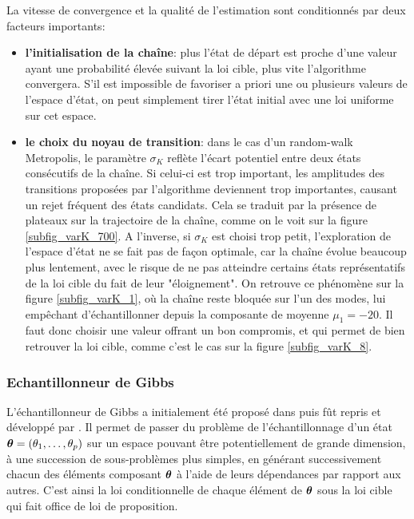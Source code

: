 La vitesse de convergence et la qualité de l'estimation sont conditionnés par deux facteurs importants: 
\begin{itemize}
	\item \textbf{l'initialisation de la chaîne}: plus l'état de départ est proche d'une valeur ayant une probabilité élevée suivant la loi cible, plus vite l'algorithme convergera. S'il est impossible de favoriser a priori une ou plusieurs valeurs de l'espace d'état, on peut simplement tirer l'état initial avec une loi uniforme sur cet espace.
	\item \textbf{le choix du noyau de transition}: dans le cas d'un random-walk Metropolis, le paramètre $\sigma_K$ reflète l'écart potentiel entre deux états consécutifs de la chaîne. Si celui-ci est trop important, les amplitudes des transitions proposées par l'algorithme deviennent trop importantes, causant un rejet fréquent des états candidats. Cela se traduit par la présence de plateaux sur la trajectoire de la chaîne, comme on le voit sur la figure \ref{subfig_varK_700}. A l'inverse, si $\sigma_K$ est choisi trop petit, l'exploration de l'espace d'état ne se fait pas de façon optimale, car la chaîne évolue beaucoup plus lentement, avec le risque de ne pas atteindre certains états représentatifs de la loi cible du fait de leur "éloignement". On retrouve ce phénomène sur la figure \ref{subfig_varK_1}, où la chaîne reste bloquée sur l'un des modes, lui empêchant d'échantillonner depuis la composante de moyenne $\mu_1 = -20$. Il faut donc choisir une valeur offrant un bon compromis, et qui permet de bien retrouver la loi cible, comme c'est le cas sur la figure \ref{subfig_varK_8}. 
\end{itemize}

\subsubsection{Echantillonneur de Gibbs}
L'échantillonneur de Gibbs a initialement été proposé dans \cite{Geman1984} puis fût repris et développé par \cite{Gelfand1990}. Il permet de passer du problème de l'échantillonnage d'un état ${\bm{\theta}} = (\theta_1, \dots, \theta_p)$ sur un espace pouvant être potentiellement de grande dimension, à une succession de sous-problèmes plus simples, en générant successivement chacun des éléments composant ${\bm{\theta}}$ à l'aide de leurs dépendances par rapport aux autres. C'est ainsi la loi conditionnelle de chaque élément de ${\bm{\theta}}$ sous la loi cible qui fait office de loi de proposition.

